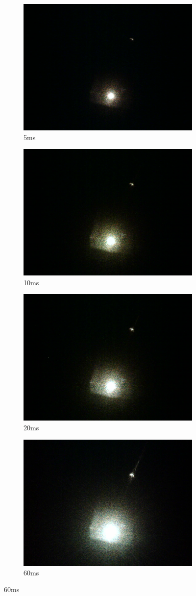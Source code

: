 \begin{figure}[ht]
    \begin{subfigure}{0.5\textwidth}
    \centering
        \includegraphics[width=0.5\linewidth]{pics/exposure/5ms}
        \caption{5ms}
        \label{fig:exp5ms}
    \end{subfigure}%
    \begin{subfigure}{0.5\textwidth}
    \centering
        \includegraphics[width=0.5\linewidth]{pics/exposure/10ms}
        \caption{10ms}
        \label{fig:exp10ms}
    \end{subfigure}
        
        \begin{subfigure}{0.5\textwidth}
    \centering
        \includegraphics[width=0.5\linewidth]{pics/exposure/20ms}
        \caption{20ms}
        \label{fig:exp20ms}
    \end{subfigure}%
    \begin{subfigure}{0.5\textwidth}
    \centering
        \includegraphics[width=0.5\linewidth]{pics/exposure/60ms}
        \caption{60ms}
        \label{fig:exp60ms}
        

\end{subfigure}
\end{figure}
